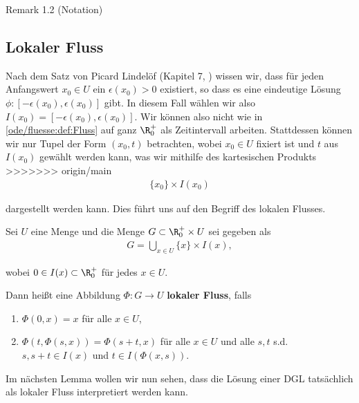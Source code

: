\documentclass[letterpaper,10pt,english]{jupyterBook}
\begin{document}
\begin{emphBox}{}{}{Remark 1.2 (Notation)}
\subsection{Lokaler Fluss}
\label{\detokenize{ode/fluesse:lokaler-fluss}}
\par
Nach dem Satz von Picard Lindelöf (Kapitel 7, \cite{Ten21}) wissen wir, dass für jeden Anfangswert \(x_0\in U\) ein \(\epsilon(x_0)>0\) existiert, so dass es eine eindeutige Lösung \(\phi: [-\epsilon(x_0), \epsilon(x_0)]\) gibt. In diesem Fall wählen wir also \(I(x_0)=[-\epsilon(x_0), \epsilon(x_0)]\). Wir können also nicht wie in \cref{ode/fluesse:def:Fluss} auf ganz \(\R^+_0\) als Zeitintervall arbeiten. Stattdessen können wir nur Tupel der Form \((x_0, t)\) betrachten, wobei \(x_0\in U\) fixiert ist und \(t\) aus \(I(x_0)\) gewählt werden kann, was wir mithilfe des kartesischen Produkts
>>>>>>> origin/main
\begin{align*}
\{x_0\}\times I(x_0)
\end{align*}
\par
dargestellt werden kann. Dies führt uns auf den Begriff des lokalen Flusses.
\label{ode/fluesse:def:LokFluss}
\begin{definition}{}{}



\par
Sei \(U\) eine Menge und die Menge \(G\subset \R^+_0\times U\) sei gegeben als
\begin{align*}
G = \bigcup_{x\in U} \{x\}\times I(x),
\end{align*}
\par
wobei \(0\in I(x)\subset \R^+_0\) für jedes \(x\in U\).

\par
Dann heißt eine Abbildung \(\Phi: G\rightarrow U\) \textbf{lokaler Fluss}, falls
\begin{enumerate}

\item {} 
\par
\(\Phi(0,x) = x\) für alle \(x\in U\),

\item {} 
\par
\(\Phi(t, \Phi(s, x)) = \Phi(s+t, x)\) für alle \(x\in U\) und alle \(s,t\) s.d. \(s, s+t\in I(x)\) und \(t\in I(\Phi(x,s))\).

\end{enumerate}
\end{definition}

\par
Im nächsten Lemma wollen wir nun sehen, dass die Lösung einer DGL tatsächlich als lokaler Fluss interpretiert werden kann.
\label{ode/fluesse:lemma-3}
\begin{lemma}{}{}




\end{lemma}
\end{emphBox}
\end{document}
